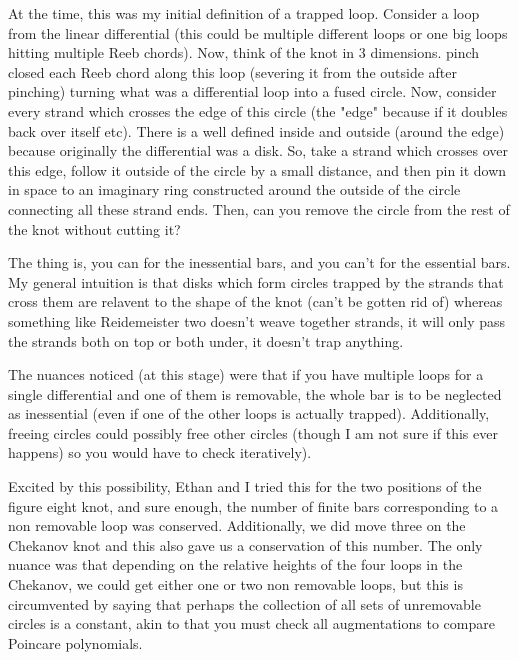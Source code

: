 \documentclass[11pt,oneside]{amsart}
\begin{document}
At the time, this was my initial definition of a trapped loop. Consider a loop from the linear differential (this could be multiple different loops or one big loops hitting multiple Reeb chords). Now, think of the knot in 3 dimensions. pinch closed each Reeb chord along this loop (severing it from the outside after pinching) turning what was a differential loop into a fused circle. Now, consider every strand which crosses the edge of this circle (the "edge" because if it doubles back over itself etc). There is a well defined inside and outside (around the edge) because originally the differential was a disk. So, take a strand which crosses over this edge, follow it outside of the circle by a small distance, and then pin it down in space to an imaginary ring constructed around the outside of the circle connecting all these strand ends. Then, can you remove the circle from the rest of the knot without cutting it? 

The thing is, you can for the inessential bars, and you can't for the essential bars. My general intuition is that disks which form circles trapped by the strands that cross them are relavent to the shape of the knot (can't be gotten rid of) whereas something like Reidemeister two doesn't weave together strands, it will only pass the strands both on top or both under, it doesn't trap anything. 

The nuances noticed (at this stage) were that if you have multiple loops for a single differential and one of them is removable, the whole bar is to be neglected as inessential (even if one of the other loops is actually trapped). Additionally, freeing circles could possibly free other circles (though I am not sure if this ever happens) so you would have to check iteratively).

Excited by this possibility, Ethan and I tried this for the two positions of the figure eight knot, and sure enough, the number of finite bars corresponding to a non removable loop was conserved. Additionally, we did move three on the Chekanov knot and this also gave us a conservation of this number. The only nuance was that depending on the relative heights of the four loops in the Chekanov, we could get either one or two non removable loops, but this is circumvented by saying that perhaps the collection of all sets of unremovable circles is a constant, akin to that you must check all augmentations to compare Poincare polynomials. 
\end{document}
